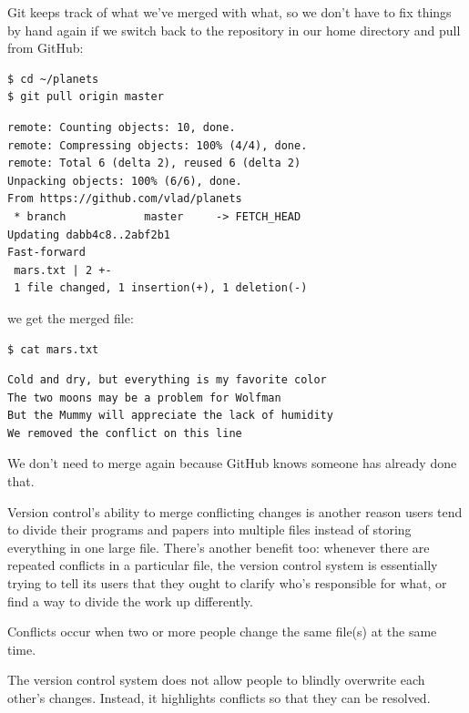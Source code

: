 \documentclass{book}
\begin{document}
Git keeps track of what we've merged with what, so we don't have to fix
things by hand again if we switch back to the repository in our home
directory and pull from GitHub:

\begin{verbatim}
$ cd ~/planets
$ git pull origin master
\end{verbatim}

\begin{verbatim}
remote: Counting objects: 10, done.
remote: Compressing objects: 100% (4/4), done.
remote: Total 6 (delta 2), reused 6 (delta 2)
Unpacking objects: 100% (6/6), done.
From https://github.com/vlad/planets
 * branch            master     -> FETCH_HEAD
Updating dabb4c8..2abf2b1
Fast-forward
 mars.txt | 2 +-
 1 file changed, 1 insertion(+), 1 deletion(-)
\end{verbatim}

we get the merged file:

\begin{verbatim}
$ cat mars.txt
\end{verbatim}

\begin{verbatim}
Cold and dry, but everything is my favorite color
The two moons may be a problem for Wolfman
But the Mummy will appreciate the lack of humidity
We removed the conflict on this line
\end{verbatim}

We don't need to merge again because GitHub knows someone has already
done that.

Version control's ability to merge conflicting changes is another reason
users tend to divide their programs and papers into multiple files
instead of storing everything in one large file. There's another benefit
too: whenever there are repeated conflicts in a particular file, the
version control system is essentially trying to tell its users that they
ought to clarify who's responsible for what, or find a way to divide the
work up differently.

\begin{keypoints}
\begin{swcitemize}
\item
  Conflicts occur when two or more people change the same file(s) at the
  same time.
\item
  The version control system does not allow people to blindly overwrite
  each other's changes. Instead, it highlights conflicts so that they
  can be resolved.
\end{swcitemize}
\end{keypoints}
\end{document}

